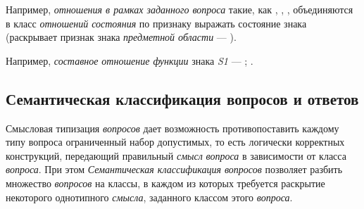Например, \textit{отношения в рамках заданного вопроса} такие, как , , , объединяются в класс \textit{отношений состояния} по признаку выражать состояние знака (раскрывает признак знака \textit{предметной области} --- ).

\begin{SCn}
\end{SCn}

Например, \textit{составное отношение функции} знака \textit{S1} --- ; .

\subsection{Семантическая классификация вопросов и ответов}
\label{chapter_questions_sec_sem_classification}

Смысловая типизация \textit{вопросов} дает возможность противопоставить каждому типу вопроса ограниченный набор допустимых, то есть логически корректных конструкций, передающий правильный \textit{смысл} \textit{вопроса} в зависимости от класса \textit{вопроса}. При этом \textit{Семантическая классификация вопросов} позволяет разбить множество \textit{вопросов} на классы, в каждом из которых требуется раскрытие некоторого однотипного \textit{смысла}, заданного классом этого \textit{вопроса}. 

